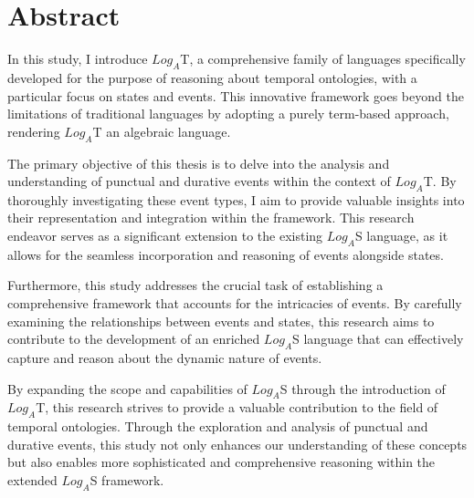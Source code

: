 \chapter*{Abstract}
\label{chap:abstract}

In this study, I introduce $Log_A$T, a comprehensive family of languages specifically developed for the purpose of reasoning about temporal ontologies,
with a particular focus on states and events.
This innovative framework goes beyond the limitations of traditional languages by adopting a purely term-based approach,
rendering $Log_A$T an algebraic language.

The primary objective of this thesis is to delve into the analysis and understanding of punctual and durative events within the context of $Log_A$T.
By thoroughly investigating these event types, I aim to provide valuable insights into their representation and integration within the framework.
This research endeavor serves as a significant extension to the existing $Log_A$S language, as it allows for the seamless incorporation and reasoning of events alongside states.

Furthermore, this study addresses the crucial task of establishing a comprehensive framework that accounts for the intricacies of events. By carefully examining the relationships between events and states, this research aims to contribute to the development of an enriched $Log_A$S language that can effectively capture and reason about the dynamic nature of events.

By expanding the scope and capabilities of $Log_A$S through the introduction of $Log_A$T, this research strives to provide a valuable contribution to the field of temporal ontologies.
Through the exploration and analysis of punctual and durative events, this study not only enhances our understanding of these concepts but also enables more sophisticated and comprehensive reasoning within the extended $Log_A$S framework.
